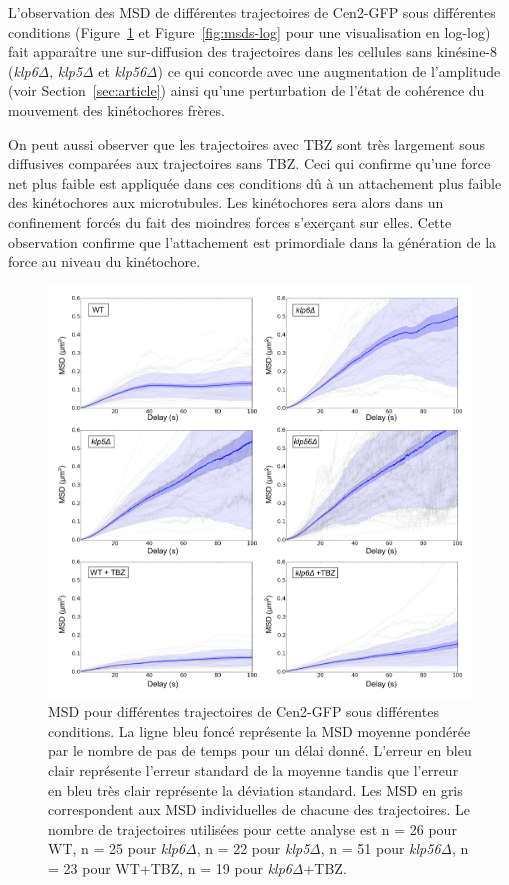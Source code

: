 \documentclass[12pt,a4paper,twoside,openright]{book}
\begin{document}
L'observation des MSD de différentes trajectoires de Cen2-GFP sous
différentes conditions (Figure~\ref{fig:msds} et
Figure~\ref{fig:msds-log} pour une visualisation en log-log) fait
apparaître une sur-diffusion des trajectoires dans les cellules sans
kinésine-8 (\emph{klp6Δ}, \emph{klp5Δ} et \emph{klp56Δ}) ce qui concorde
avec une augmentation de l'amplitude (voir Section~\ref{sec:article})
ainsi qu'une perturbation de l'état de cohérence du mouvement des
kinétochores frères.

On peut aussi observer que les trajectoires avec TBZ sont très largement
sous diffusives comparées aux trajectoires sans TBZ. Ceci qui confirme
qu'une force net plus faible est appliquée dans ces conditions dû à un
attachement plus faible des kinétochores aux microtubules. Les
kinétochores sera alors dans un confinement forcés du fait des moindres
forces s'exerçant sur elles. Cette observation confirme que
l'attachement est primordiale dans la génération de la force au niveau
du kinétochore.

\begin{figure}[htbp]
\centering
\includegraphics{figures/results/imaging/msds.png}
\caption[MSD pour différentes trajectoires de Cen2-GFP sous différentes conditions.]{\label{fig:msds}MSD
pour différentes trajectoires de Cen2-GFP sous différentes conditions.
La ligne bleu foncé représente la MSD moyenne pondérée par le nombre de
pas de temps pour un délai donné. L'erreur en bleu clair représente
l'erreur standard de la moyenne tandis que l'erreur en bleu très clair
représente la déviation standard. Les MSD en gris correspondent aux MSD
individuelles de chacune des trajectoires. Le nombre de trajectoires
utilisées pour cette analyse est n = 26 pour WT, n = 25 pour
\emph{klp6Δ}, n = 22 pour \emph{klp5Δ}, n = 51 pour \emph{klp56Δ}, n =
23 pour WT+TBZ, n = 19 pour \emph{klp6Δ}+TBZ.}
\end{figure}
\end{document}
